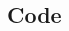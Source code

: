\documentclass[11pt,openright,a4paper]{report}
\begin{document}
\begin{landscape}
\begin{multicols}{2}
\chapter{Code}

% 



 






\end{multicols}
\end{landscape}
\end{document}
